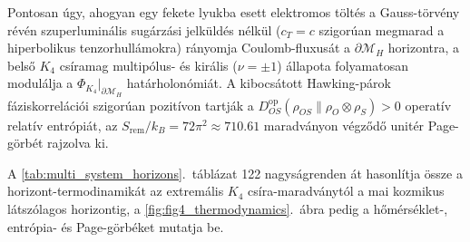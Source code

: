 \documentclass[11pt,a4paper]{article}
\theoremstyle{remark}
\begin{document}
\begin{itemize}
\begin{equation}
    \label{eq:elliptic_gauss}
  \end{equation}
  Pontosan \'ugy, ahogyan egy fekete lyukba esett elektromos t\"olt\'es a Gauss-t\"orv\'eny r\'ev\'en szuperlumin\'alis sug\'arz\'asi jelk\"uld\'es n\'elk\"ul ($c_T = c$ szigor\'uan megmarad a hiperbolikus tenzorhull\'amokra) r\'anyomja Coulomb-fluxus\'at a $\partial\mathcal{M}_H$ horizontra, a bels\H{o} $K_4$ cs\'iramag multip\'olus- \'es kir\'alis ($\nu = \pm 1$) \'allapota folyamatosan modul\'alja a $\Phi_{K_4}|_{\partial\mathcal{M}_H}$ hat\'arholon\'omi\'at. A kibocs\'atott Hawking-p\'arok f\'aziskorrel\'aci\'oi szigor\'uan pozit\'ivon tartj\'ak a $D_{OS}^{\mathrm{op}}(\rho_{OS} \parallel \rho_O \otimes \rho_S) > 0$ operat\'iv relat\'iv entr\'opi\'at, az $S_{\mathrm{rem}}/k_B = 72\pi^2 \approx 710.61$ maradv\'anyon v\'egz\H{o}d\H{o} unit\'er Page-g\"orb\'et rajzolva ki.
\end{itemize}

A \ref{tab:multi_system_horizons}.\ t\'abl\'azat 122 nagys\'agrenden \'at hasonl\'itja \"ossze a horizont-termodinamik\'at az extrem\'alis $K_4$ cs\'ira-maradv\'anyt\'ol a mai kozmikus l\'atsz\'olagos horizontig, a \ref{fig:fig4_thermodynamics}.\ \'abra pedig a h\H{o}m\'ers\'eklet-, entr\'opia- \'es Page-g\"orb\'eket mutatja be.
\end{document}
